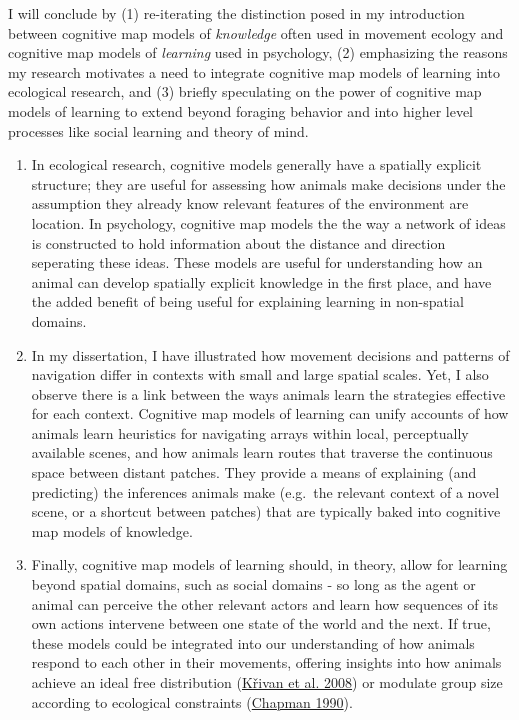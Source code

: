 \documentclass[twoside,12pt,final]{ucthesis-CA2012}
\begin{document}
\begin{ucmainmatter}
I will conclude by (1) re-iterating the distinction posed in my introduction between cognitive map models of \emph{knowledge} often used in movement ecology and cognitive map models of \emph{learning} used in psychology, (2) emphasizing the reasons my research motivates a need to integrate cognitive map models of learning into ecological research, and (3) briefly speculating on the power of cognitive map models of learning to extend beyond foraging behavior and into higher level processes like social learning and theory of mind.
\begin{enumerate}
\def\labelenumi{(\arabic{enumi})}
\item
  In ecological research, cognitive models generally have a spatially explicit structure; they are useful for assessing how animals make decisions under the assumption they already know relevant features of the environment are location. In psychology, cognitive map models the the way a network of ideas is constructed to hold information about the distance and direction seperating these ideas. These models are useful for understanding how an animal can develop spatially explicit knowledge in the first place, and have the added benefit of being useful for explaining learning in non-spatial domains.
\item
  In my dissertation, I have illustrated how movement decisions and patterns of navigation differ in contexts with small and large spatial scales. Yet, I also observe there is a link between the ways animals learn the strategies effective for each context. Cognitive map models of learning can unify accounts of how animals learn heuristics for navigating arrays within local, perceptually available scenes, and how animals learn routes that traverse the continuous space between distant patches. They provide a means of explaining (and predicting) the inferences animals make (e.g.~the relevant context of a novel scene, or a shortcut between patches) that are typically baked into cognitive map models of knowledge.
\item
  Finally, cognitive map models of learning should, in theory, allow for learning beyond spatial domains, such as social domains - so long as the agent or animal can perceive the other relevant actors and learn how sequences of its own actions intervene between one state of the world and the next. If true, these models could be integrated into our understanding of how animals respond to each other in their movements, offering insights into how animals achieve an ideal free distribution (\protect\hyperlink{ref-krivan2008}{Křivan et al. 2008}) or modulate group size according to ecological constraints (\protect\hyperlink{ref-chapman1990}{Chapman 1990}).

\end{enumerate}
\end{ucmainmatter}
\end{document}
